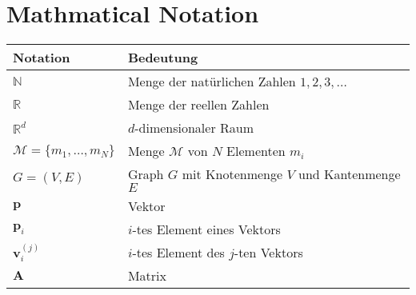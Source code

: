 
\chapter*{Mathmatical Notation} \label{Notation}

\newcommand{\tabdummy}{\midrule[0pt]}

\begin{tabular}{p{}p{}}
  \textbf{Notation} & \textbf{Bedeutung} \\ \toprule[1pt]
   $\mathbb{N}$ & Menge der natürlichen Zahlen ${1, 2, 3, \ldots}$ \\ \tabdummy
   $\mathbb{R}$ & Menge der reellen Zahlen \\ \tabdummy
   $\mathbb{R}^d$ & $d$-dimensionaler Raum\\ \tabdummy
   $\mathcal{M} = \{m_1,\ldots,m_N\}$ & Menge $\mathcal{M}$ von $N$ Elementen $m_i$ \\ \tabdummy
   $G=(V,E)$ & Graph $G$ mit Knotenmenge $V$ und Kantenmenge $E$ \\ \tabdummy
   $\mathbf{p}$ & Vektor\\ \tabdummy
   $\mathbf{p}_i$ & $i$-tes Element eines Vektors \\ \tabdummy
   $\mathbf{v}^{(j)}_i$ & $i$-tes Element des $j$-ten Vektors \\ \tabdummy
   $\mathbf{A}$ & Matrix
\end{tabular}
